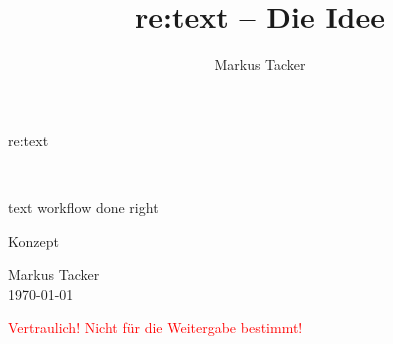 \documentclass[11pt,a4paper]{article}
\begin{document}
\author{Markus Tacker}
\title{re:text -- Die Idee}

\begin{center}

\begin{huge}re:text\end{huge}\\
\begin{small}text workflow done right\end{small}

\bigskip

\begin{huge}Konzept\end{huge}

\bigskip

\begin{small}Markus Tacker\\
\today

\textcolor{red}{Vertraulich! Nicht für die Weitergabe bestimmt!}

\end{small}

\end{center}

\tableofcontents




\end{document}
